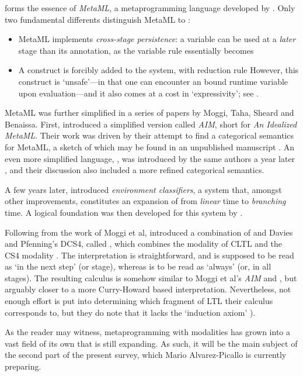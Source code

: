 \documentclass[a4paper]{amsart}
\begin{document}
 forms the essence of \emph{MetaML}, a
metaprogramming language developed by
\cite{Taha1997, Taha2000}.  Only two fundamental differents
distinguish MetaML to : \begin{itemize}
  \item MetaML implements \emph{cross-stage persistence}: a
  variable can be used at a \emph{later} stage than its
  annotation, as the variable rule essentially becomes 

  \item A  construct is forcibly added to the
  system, with reduction rule  However, this construct is `unsafe'---in that one can encounter an
  bound runtime variable upon evaluation---and it also comes at a
  cost in `expressivity'; see \cite[\S 12]{Taha2000}.
\end{itemize} MetaML was further simplified in a series of papers
by Moggi, Taha, Sheard and Benaissa.  First, \cite{Moggi1999}
introduced a simplified version called \emph{AIM}, short for
\emph{An Idealized MetaML}. Their work was driven by their attempt
to find a categorical semantics for MetaML, a sketch of which may
be found in an unpublished manuscript \citep{Benaissa1998a}. An
even more simplified language, , was introduced by
the same authors a year later \citep{Benaissa1999}, and their
discussion also included a more refined categorical semantics.

A few years later, \cite{Taha2003a} introduced \emph{environment
classifiers}, a system that, amongst other improvements,
constitutes an expansion of  from \emph{linear}
time to \emph{branching} time. A logical foundation was then
developed for this system by \cite{Tsukada2010}.

Following from the work of Moggi et al, \cite{Yuse2006} introduced
a combination of  and Davies and Pfenning's
\textsf{DCS4}, called , which combines the
 modality of \textsf{CLTL} and the \textsf{CS4} modality
. The interpretation is straightforward, and  is
supposed to be read as `in the next step' (or stage), whereas
 is to be read as `always' (or, in all stages). The
resulting calculus is somehow similar to Moggi et al's \emph{AIM}
and , but arguably closer to a more Curry-Howard
based interpretation. Nevertheless, not enough effort is put into
determining which fragment of LTL their calculus corresponds to,
but they do note that it lacks the `induction axiom' ).

As the reader may witness, metaprogramming with modalities has
grown into a vast field of its own that is still expanding. As
such, it will be the main subject of the second part of the
present survey, which Mario Alvarez-Picallo is currently
preparing.
\end{document}
